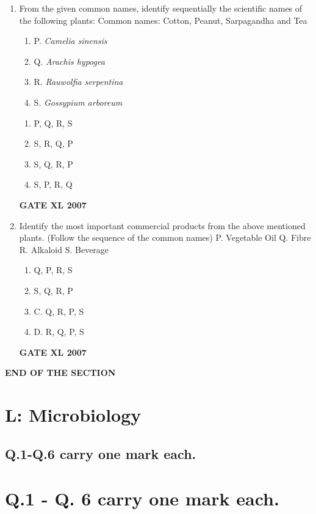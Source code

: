 \documentclass[journal,12pt,onecolumn]{IEEEtran}
\begin{document}
\begin{enumerate}
\item From the given common names, identify sequentially the scientific names of the following plants:
Common names: Cotton, Peanut, Sarpagandha and Tea
\begin{enumerate}
    \item P. \textit{Camelia sinensis}
    \item Q. \textit{Arachis hypogea}
    \item R. \textit{Rauwolfia serpentina}
    \item S. \textit{Gossypium arboreum}
\end{enumerate}
\begin{enumerate}
    \item P, Q, R, S
    \item S, R, Q, P
    \item S, Q, R, P
    \item S, P, R, Q
\end{enumerate}\hfill{\textbf{GATE XL 2007}}

\item Identify the most important commercial products from the above mentioned plants. (Follow the sequence of the common names)
    P. Vegetable Oil
    Q. Fibre
    R. Alkaloid
    S. Beverage
\begin{enumerate}
    \item Q, P, R, S
    \item S, Q, R, P
    \item C. Q, R, P, S
    \item D. R, Q, P, S
\end{enumerate}\hfill{\textbf{GATE XL 2007}}
\end{enumerate}

\begin{center}
\textbf{END OF THE SECTION}
\end{center}

\newpage

\section*{L: Microbiology}
\subsection*{Q.1-Q.6 carry one mark each.}
\section*{Q.1 - Q. 6 carry one mark each.}
\end{document}
